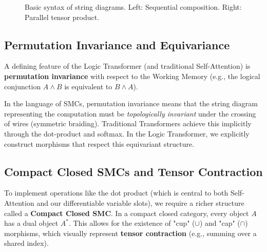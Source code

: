 \documentclass[runningheads]{llncs}
\begin{document}
\begin{figure}[h]
	\centering
	\caption{Basic syntax of string diagrams. Left: Sequential composition. Right: Parallel tensor product.}
	\label{fig:string-diagram-basics}
\end{figure}

\subsection{Permutation Invariance and Equivariance}
A defining feature of the Logic Transformer (and traditional Self-Attention) is \textbf{permutation invariance} with respect to the Working Memory (e.g., the logical conjunction $A \wedge B$ is equivalent to $B \wedge A$).

In the language of SMCs, permutation invariance means that the string diagram representing the computation must be \textit{topologically invariant} under the crossing of wires (symmetric braiding). Traditional Transformers achieve this implicitly through the dot-product and softmax. In the Logic Transformer, we explicitly construct morphisms that respect this equivariant structure.

\subsection{Compact Closed SMCs and Tensor Contraction}
To implement operations like the dot product (which is central to both Self-Attention and our differentiable variable slots), we require a richer structure called a \textbf{Compact Closed SMC}.
In a compact closed category, every object $A$ has a dual object $A^*$. This allows for the existence of "cup" ($\cup$) and "cap" ($\cap$) morphisms, which visually represent \textbf{tensor contraction} (e.g., summing over a shared index).
\end{document}
